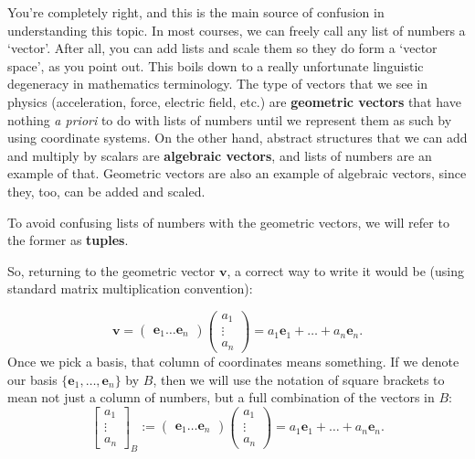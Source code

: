 \documentclass[../master.tex]{subfiles}
\begin{document}
	
	You're completely right, and this is the main source of confusion in understanding this topic. 
	In most courses, we can freely call any list of numbers a `vector'. After all, you can add lists and scale them so they do form a `vector space', as you point out. This boils down to a really unfortunate linguistic degeneracy in mathematics terminology. The type of vectors that we see in physics (acceleration, force, electric field, etc.) are \textbf{geometric vectors} that have nothing \emph{a priori} to do with lists of numbers until we represent them as such by using coordinate systems. On the other hand, abstract structures that we can add and multiply by scalars are \textbf{algebraic vectors}, and lists of numbers are an example of that. Geometric vectors are also an example of algebraic vectors, since they, too, can be added and scaled. 
	
	
	To avoid confusing lists of numbers with the geometric vectors, we will refer to the former as \textbf{tuples}.
	
	So, returning to the geometric vector $\mathbf v$, a correct way to write it would be (using standard matrix multiplication convention):
	
	\begin{equation}\label{eq:Repv1}
		\mathbf v = \begin{pmatrix}
			\mathbf e_1  \dots \mathbf e_n
		\end{pmatrix}
		\begin{pmatrix}
			a_1 \\ \vdots \\a_n
		\end{pmatrix} 
		= a_1 \mathbf e_1 + \dots + a_n \mathbf e_n.
	\end{equation}	
	Once we pick a basis, that column of coordinates means something. If we denote our basis $\{\mathbf e_1, \dots, \mathbf e_n \}$ by $B$, then we will use the notation of square brackets to mean not just a column of numbers, but a full combination of the vectors in $B$:
	\begin{equation}\label{eq:Repv2}
		\begin{bmatrix} a_1 \\ \vdots \\a_n	\end{bmatrix}_B := \begin{pmatrix}
			\mathbf e_1  \dots \mathbf e_n
		\end{pmatrix}
		\begin{pmatrix}
			a_1 \\ \vdots \\a_n
		\end{pmatrix} = a_1 \mathbf e_1 + \dots + a_n \mathbf e_n.
	\end{equation}
	
\end{document}
